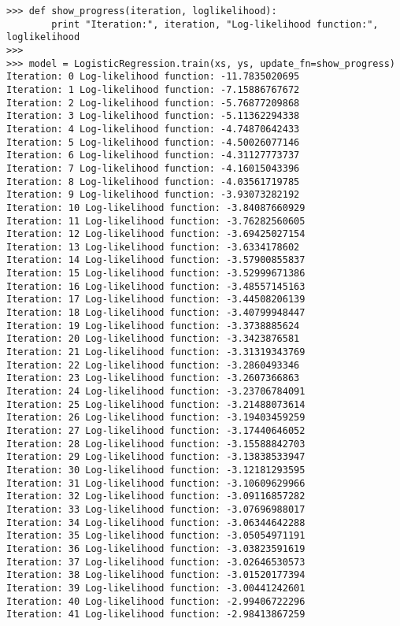 \documentclass{report}
\begin{document}
\begin{verbatim}
>>> def show_progress(iteration, loglikelihood):
        print "Iteration:", iteration, "Log-likelihood function:", loglikelihood
>>>
>>> model = LogisticRegression.train(xs, ys, update_fn=show_progress)
Iteration: 0 Log-likelihood function: -11.7835020695
Iteration: 1 Log-likelihood function: -7.15886767672
Iteration: 2 Log-likelihood function: -5.76877209868
Iteration: 3 Log-likelihood function: -5.11362294338
Iteration: 4 Log-likelihood function: -4.74870642433
Iteration: 5 Log-likelihood function: -4.50026077146
Iteration: 6 Log-likelihood function: -4.31127773737
Iteration: 7 Log-likelihood function: -4.16015043396
Iteration: 8 Log-likelihood function: -4.03561719785
Iteration: 9 Log-likelihood function: -3.93073282192
Iteration: 10 Log-likelihood function: -3.84087660929
Iteration: 11 Log-likelihood function: -3.76282560605
Iteration: 12 Log-likelihood function: -3.69425027154
Iteration: 13 Log-likelihood function: -3.6334178602
Iteration: 14 Log-likelihood function: -3.57900855837
Iteration: 15 Log-likelihood function: -3.52999671386
Iteration: 16 Log-likelihood function: -3.48557145163
Iteration: 17 Log-likelihood function: -3.44508206139
Iteration: 18 Log-likelihood function: -3.40799948447
Iteration: 19 Log-likelihood function: -3.3738885624
Iteration: 20 Log-likelihood function: -3.3423876581
Iteration: 21 Log-likelihood function: -3.31319343769
Iteration: 22 Log-likelihood function: -3.2860493346
Iteration: 23 Log-likelihood function: -3.2607366863
Iteration: 24 Log-likelihood function: -3.23706784091
Iteration: 25 Log-likelihood function: -3.21488073614
Iteration: 26 Log-likelihood function: -3.19403459259
Iteration: 27 Log-likelihood function: -3.17440646052
Iteration: 28 Log-likelihood function: -3.15588842703
Iteration: 29 Log-likelihood function: -3.13838533947
Iteration: 30 Log-likelihood function: -3.12181293595
Iteration: 31 Log-likelihood function: -3.10609629966
Iteration: 32 Log-likelihood function: -3.09116857282
Iteration: 33 Log-likelihood function: -3.07696988017
Iteration: 34 Log-likelihood function: -3.06344642288
Iteration: 35 Log-likelihood function: -3.05054971191
Iteration: 36 Log-likelihood function: -3.03823591619
Iteration: 37 Log-likelihood function: -3.02646530573
Iteration: 38 Log-likelihood function: -3.01520177394
Iteration: 39 Log-likelihood function: -3.00441242601
Iteration: 40 Log-likelihood function: -2.99406722296
Iteration: 41 Log-likelihood function: -2.98413867259
\end{verbatim}
\end{document}
